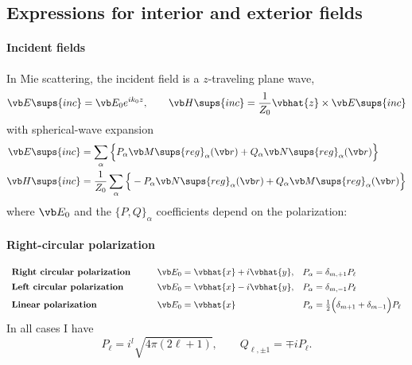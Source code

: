 \documentclass[letterpaper]{article}
\begin{document}
\subsection{Expressions for interior and exterior fields}

\paragraph{Incident fields}

In Mie scattering, the incident field is a $z$-traveling plane wave,
$$ \vb E\sups{inc}=\vb E_0 e^{ik_0 z}, \qquad 
   \vb H\sups{inc}=\frac{1}{Z_0}\vbhat{z} \times \vb E\sups{inc}
$$
with spherical-wave expansion
\begin{align*}
\vb E\sups{inc}&=
   \sum_\alpha \Big\{ P_\alpha \vb M\sups{reg}_\alpha(\vb r)
                     +Q_\alpha \vb N\sups{reg}_\alpha(\vb r)
               \Big\}
\\
\vb H\sups{inc}&=
   \frac{1}{Z_0}
   \sum_\alpha \Big\{ -P_\alpha \vb N\sups{reg}_\alpha(\vb r)
                      +Q_\alpha \vb M\sups{reg}_\alpha(\vb r)
               \Big\}
\end{align*}
where $\vb E_0$ and the $\{P,Q\}_\alpha$ coefficients depend 
on the polarization:

\paragraph{Right-circular polarization}

$$\begin{array}{lll}
\textbf{Right circular polarization}
\qquad
&\vb E_0=\vbhat{x} + i\vbhat{y}, 
&P_\alpha=\delta_{m,+1} P_\ell
\\[5pt]
\textbf{Left circular polarization}
\qquad
&\vb E_0=\vbhat{x} - i\vbhat{y}, 
&P_\alpha=\delta_{m,-1} P_\ell
\\[5pt]
\textbf{Linear polarization}
\qquad
&\vb E_0=\vbhat{x}
&P_\alpha=\frac{1}{2}\Big(\delta_{m+1} + \delta_{m-1}\Big)  P_\ell
\end{array}$$
In all cases I have 
$$ P_\ell=i^l\sqrt{4\pi(2\ell+1)}, \qquad Q_{\ell,\pm 1}=\mp i P_\ell. $$
\end{document}
